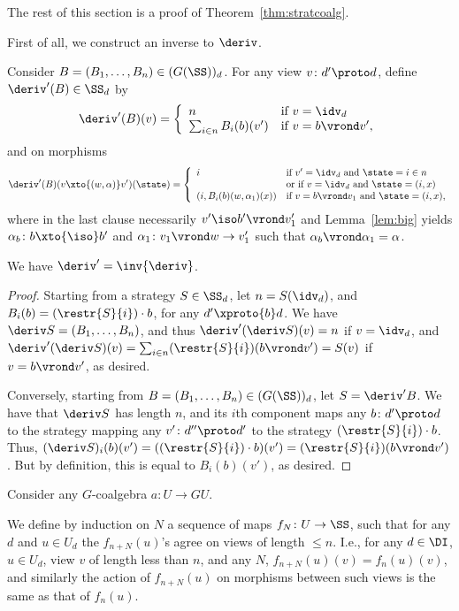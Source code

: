 \documentclass{LMCS}
\theoremstyle{plain}\newtheorem{satz}[thm]{Satz}
\begin{document}
The rest of this section is a proof of Theorem~\ref{thm:stratcoalg}. 

First of all, we construct an inverse to $\deriv$.  
\begin{defi}
  Consider $B = (B_1, \ldots, B_n) \in (G(\SS))_d$. For any view $v
  \colon d' \proto d$, define $\deriv'(B) \in \SS_d$ by
$$\deriv'(B) (v) =   \left \{ \begin{array}{ll}
n & \mbox{if $v =
  \idv_d$} \\
\sum_{i \in n} B_i(b)(v') & \mbox{if $v = b \vrond v'$},
\end{array} \right .$$
and on morphisms $$\deriv'(B) (v \xto{(w,\alpha)} v')(\state) =
\left \{ \begin{array}{ll}
i & \mbox{if $v' = \idv_d$ and $\state = i \in n$} \\
& \mbox{or if $v = \idv_d$ and $\state = (i,x)$} \\
(i, B_i(b)(w,\alpha_1)(x)) & \mbox{if $v = b \vrond v_1$ and $\state = (i,x)$},
\end{array} \right .$$
where in the last clause necessarily $v' \iso b' \vrond v'_1$ and
Lemma~\ref{lem:big} yields $\alpha_b \colon b \xto{\iso} b'$ and $\alpha_1 \colon v_1 \vrond w \to v'_1$
such that $\alpha_b \vrond \alpha_1 = \alpha$.
\end{defi}
\begin{lem}
  We have $\deriv' = \inv{\deriv}$.
\end{lem}
\begin{proof}
  Starting from a strategy $S \in \SS_d$, let $n = S(\idv_d)$, and
  $B_i(b) = (\restr{S}{i}) \cdot b$, for any $d' \xproto{b} d$.
We have $\deriv S = (B_1, \ldots, B_n)$, and thus
  $\deriv' (\deriv S) (v) = n$ if $v = \idv_d$, and $\deriv' (\deriv
  S) (v) = \sum_{i \in n} (\restr{S}{i})(b \vrond v') = S(v)$ if $v =
  b \vrond v'$, as desired.

  Conversely, starting from $B = (B_1, \ldots, B_n) \in
  (G(\SS))_d$, let $S = \deriv' B$.  We have that $\deriv S$ has
  length $n$, and its $i$th component maps any $b \colon d' \proto d$
  to the strategy mapping any $v' \colon d'' \proto d'$ to the
  strategy $(\restr{S}{i}) \cdot b$. Thus, $(\deriv S)_i (b) (v') =
  ((\restr{S}{i}) \cdot b) (v') = (\restr{S}{i}) (b \vrond v')$.  But
  by definition, this is equal to $B_i (b) (v')$, as desired.  
\end{proof}

Consider any $G$-coalgebra $a \colon U \to G U$.

We define by induction on $N$ a sequence of maps $f_N \colon U \to
\SS$, such that for any $d$ and $u \in U_d$ the $f_{n+N}(u)$'s agree
on views of length $\leq n$. I.e., for any $d \in \DI$, $u \in U_d$,
view $v$ of length less than $n$, and any $N$, $f_{n+N} (u) (v) =
f_{n} (u) (v)$, and similarly the action of $f_{n+N} (u)$ on morphisms
between such views is the same as that of $f_{n} (u)$.
\end{document}
